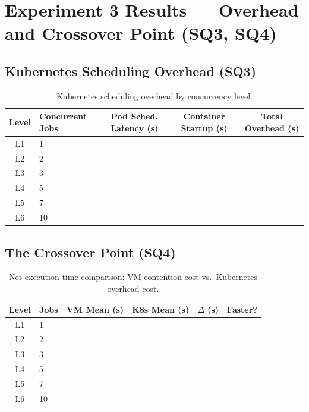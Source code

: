 
\section{Experiment 3 Results --- Overhead and Crossover Point (SQ3, SQ4)}
\label{sec:results-exp3}


\subsection{Kubernetes Scheduling Overhead (SQ3)}
\label{subsec:results-overhead}

\begin{table}[H]
  \centering
  \caption{Kubernetes scheduling overhead by concurrency level.}
  \label{tab:overhead}
  \small
  \begin{tabular}{clccc}
    \toprule
    \textbf{Level} & \textbf{Concurrent Jobs} & \textbf{Pod Sched. Latency (s)} & \textbf{Container Startup (s)} & \textbf{Total Overhead (s)} \\
    \midrule
    L1 & 1  & & & \\
    L2 & 2  & & & \\
    L3 & 3  & & & \\
    L4 & 5  & & & \\
    L5 & 7  & & & \\
    L6 & 10 & & & \\
    \bottomrule
  \end{tabular}
\end{table}

\subsection{The Crossover Point (SQ4)}
\label{subsec:results-crossover}

\begin{table}[H]
  \centering
  \caption{Net execution time comparison: VM contention cost vs.\ Kubernetes overhead cost.}
  \label{tab:crossover}
  \small
  \begin{tabular}{clcccc}
    \toprule
    \textbf{Level} & \textbf{Jobs} & \textbf{VM Mean (s)} & \textbf{K8s Mean (s)} & \textbf{$\Delta$ (s)} & \textbf{Faster?} \\
    \midrule
    L1 & 1  & & & & \\
    L2 & 2  & & & & \\
    L3 & 3  & & & & \\
    L4 & 5  & & & & \\
    L5 & 7  & & & & \\
    L6 & 10 & & & & \\
    \bottomrule
  \end{tabular}
\end{table}

